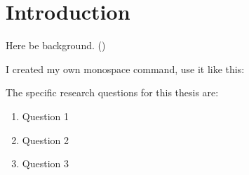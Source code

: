 \section{Introduction}
\justify
Here be background. (\cite{Geurs2004})

I created my own monospace command, use it like this: 

The specific research questions for this thesis are:

\begin{spacing}{1}
\begin{enumerate}[label=\Roman*] %
  \item Question 1
  \item Question 2
  \item Question 3
\end{enumerate}
\end{spacing}